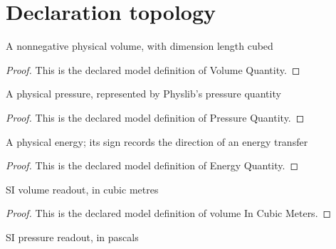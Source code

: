 \section{Declaration topology}
\begin{definition}
  \label{def:physics:phyx-mini-0344:phyxminiproblems-problemphyxmini0344-volumequantity}
  A nonnegative physical volume, with dimension length cubed
\end{definition}
\begin{proof}
  This is the declared model definition of Volume Quantity.
\end{proof}
\begin{definition}
  \label{def:physics:phyx-mini-0344:phyxminiproblems-problemphyxmini0344-pressurequantity}
  A physical pressure, represented by Physlib's pressure quantity
\end{definition}
\begin{proof}
  This is the declared model definition of Pressure Quantity.
\end{proof}
\begin{definition}
  \label{def:physics:phyx-mini-0344:phyxminiproblems-problemphyxmini0344-energyquantity}
  A physical energy; its sign records the direction of an energy transfer
\end{definition}
\begin{proof}
  This is the declared model definition of Energy Quantity.
\end{proof}
\begin{definition}
  \label{def:physics:phyx-mini-0344:phyxminiproblems-problemphyxmini0344-volumeincubicmeters}
  SI volume readout, in cubic metres
\end{definition}
\begin{proof}
  This is the declared model definition of volume In Cubic Meters.
\end{proof}
\begin{definition}
  \label{def:physics:phyx-mini-0344:phyxminiproblems-problemphyxmini0344-pressureinpascals}
  SI pressure readout, in pascals
\end{definition}

